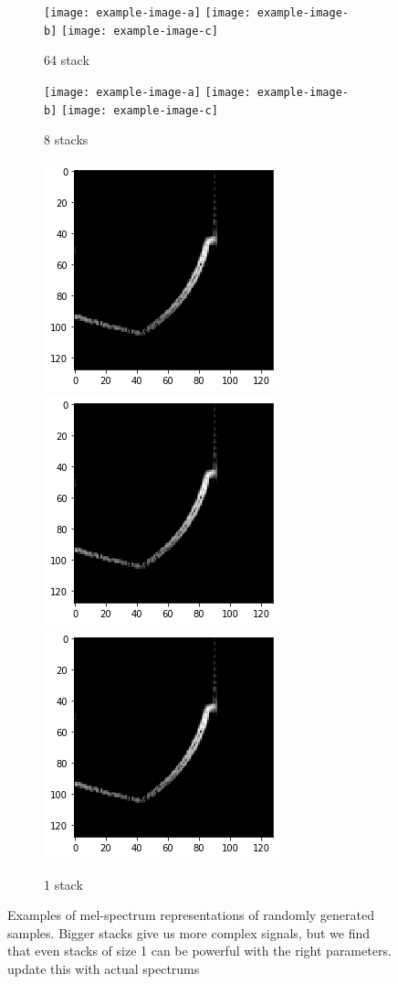 \documentclass{nime-alternate} %
\begin{document}
\begin{figure}[h!]
\centering
\begin{subfigure}[b]{\linewidth}
\texttt{[image: example-image-a]}
\texttt{[image: example-image-b]}
\texttt{[image: example-image-c]}
\caption{64 stack}\label{fig:64stack}
\setcounter{subfigure}{0}%
\end{subfigure}

\begin{subfigure}[b]{\linewidth}
\texttt{[image: example-image-a]}
\texttt{[image: example-image-b]}
\texttt{[image: example-image-c]}
\caption{8 stacks}\label{fig:8stacl}
\setcounter{subfigure}{1}%
\end{subfigure}

\begin{subfigure}[b]{\linewidth}
\includegraphics[width=0.3\linewidth]{images/specplot.png}
\includegraphics[width=0.3\linewidth]{images/specplot.png}
\includegraphics[width=0.3\linewidth]{images/specplot.png}
\caption{1 stack}\label{fig:1stack}
\setcounter{subfigure}{2}%
\end{subfigure}
\caption{Examples of mel-spectrum representations of randomly generated samples. Bigger stacks give us more complex signals, but we find that even stacks of size 1 can be powerful with the right parameters. \colorbox{green!=40}{update this with actual spectrums}}
\label{fig:stackspectrums}
\end{figure}
\end{document}
